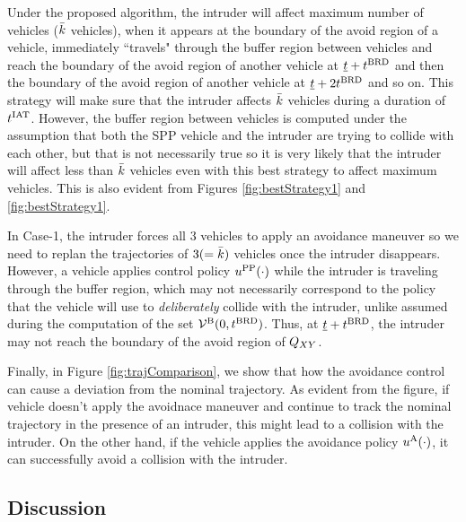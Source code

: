 Under the proposed algorithm, the intruder will affect maximum number of vehicles ($\bar{k}$ vehicles), when it appears at the boundary of the avoid region of a vehicle, immediately ``travels" through the buffer region between vehicles and reach the boundary of the avoid region of another vehicle at $\underline{t} + t^\text{BRD}$ and then the boundary of the avoid region of another vehicle at $\underline{t} + 2t^\text{BRD}$ and so on. This strategy will make sure that the intruder affects $\bar{k}$ vehicles during a duration of $t^\text{IAT}$. However, the buffer region between vehicles is computed under the assumption that both the SPP vehicle and the intruder are trying to collide with each other, but that is not necessarily true so it is very likely that the intruder will affect less than $\bar{k}$ vehicles even with this best strategy to affect maximum vehicles. This is also evident from Figures \ref{fig:bestStrategy1} and \ref{fig:bestStrategy1}.   

In Case-1, the intruder forces all 3 vehicles to apply an avoidance maneuver so we need to replan the trajectories of $3 (= \bar{k})$ vehicles once the intruder disappears. However, a vehicle applies control policy $u^{\text{PP}}(\cdot)$ while the intruder is traveling through the buffer region, which may not necessarily correspond to the policy that the vehicle will use to \textit{deliberately} collide with the intruder, unlike assumed during the computation of the set $\mathcal{V}^{\text{B}}(0, t^\text{BRD})$. Thus, at $\underline{t} + t^\text{BRD}$, the intruder may not reach the boundary of the avoid region of $Q_{XY}$.        
 
Finally, in Figure \ref{fig:trajComparison}, we show that how the avoidance control can cause a deviation from the nominal trajectory. As evident from the figure, if vehicle doesn't apply the avoidnace maneuver and continue to track the nominal trajectory in the presence of an intruder, this might lead to a collision with the intruder. On the other hand, if the vehicle applies the avoidance policy $u^{\text{A}}(\cdot)$, it can successfully avoid a collision with the intruder.   


\subsection{Discussion \label{sec:discuss}}
